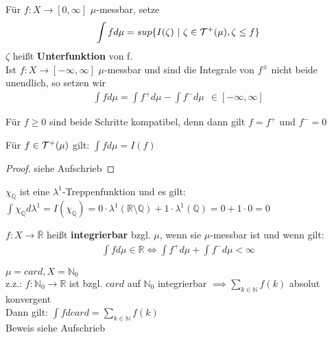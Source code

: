 \documentclass[11pt,a4paper,fleqn,openany]{report}
\begin{document}
    \begin{definition}
      Für $f: X \to [0,\infty]$ $\mu$-messbar, setze
      \begin{align*}
        \int f d\mu = sup\{I(\zeta) \ | \ \zeta \in \mathcal{T}^+(\mu), \zeta \leq f\}
      \end{align*}
      $\zeta$ heißt \textbf{Unterfunktion} von f.\\
      Ist $f: X \to [-\infty, \infty]$ $\mu$-messbar und sind die Integrale von $f^{\pm}$ nicht beide unendlich, so setzen wir
      \begin{align*}
        \int f d\mu = \int f^+ d\mu - \int f^- d\mu \ \ \in [-\infty, \infty] 
      \end{align*}
    \end{definition}

    \begin{remark}
      Für $f \geq 0$ sind beide Schritte kompatibel, denn dann gilt $f = f^+$ und $f^- = 0$
    \end{remark}

    \begin{lemma}
      Für $f \in \mathcal{T}^+(\mu)$ gilt: $\int f d\mu = I(f)$
    \end{lemma}

    \begin{proof}
      siehe Aufschrieb
    \end{proof}

    \begin{example}
      $\chi_{\mathbb{Q}}$ ist eine $\lambda^1$-Treppenfunktion und es gilt:\\
      $\int \chi_{\mathbb{Q}} d\lambda^1 = I(\chi_{\mathbb{Q}}) = 0 \cdot \lambda^1(\mathbb{R} \setminus \mathbb{Q}) + 1 \cdot \lambda^1(\mathbb{Q}) = 0 + 1 \cdot 0 = 0$
    \end{example}

    \begin{definition}
      $f:X \to \bar{\mathbb{R}}$ heißt \textbf{integrierbar} bzgl. $\mu$, wenn sie $\mu$-messbar ist und wenn gilt:
      \begin{align*}
        \int f d\mu \in \mathbb{R} \Leftrightarrow \int f^+ d\mu + \int f^- d\mu < \infty
      \end{align*}
    \end{definition}

    \begin{example}
      $\mu = card, X = \mathbb{N}_0$\\
      z.z.: $f: \mathbb{N}_0 \to \mathbb{R}$ ist bzgl. $card$ auf $\mathbb{N}_0$ integrierbar $\implies \sum\limits_{k \in \mathbb{N}} f(k)$ absolut konvergent\\
      Dann gilt: $\int f d card = \sum\limits_{k \in \mathbb{N}} f(k)$\\
      Beweis siehe Aufschrieb
    \end{example}
\end{document}
